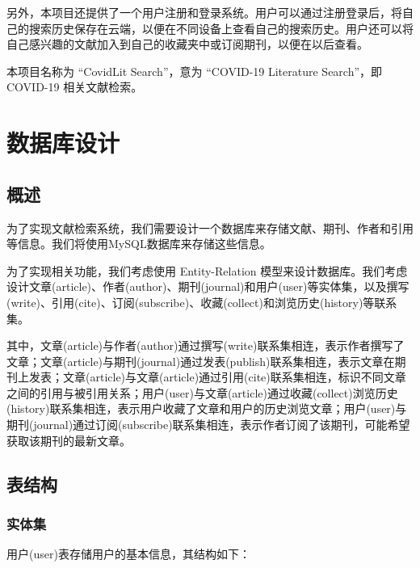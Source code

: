 \documentclass[UTF8,openany]{ctexbook}
\begin{document}
另外，本项目还提供了一个用户注册和登录系统。用户可以通过注册登录后，将自己的搜索历史保存在云端，以便在不同设备上查看自己的搜索历史。用户还可以将自己感兴趣的文献加入到自己的收藏夹中或订阅期刊，以便在以后查看。

本项目名称为 ``CovidLit Search''，意为 ``COVID-19 Literature Search''，即 COVID-19 相关文献检索。

\chapter{数据库设计}

\section{概述}

为了实现文献检索系统，我们需要设计一个数据库来存储文献、期刊、作者和引用等信息。我们将使用MySQL数据库来存储这些信息。

为了实现相关功能，我们考虑使用 Entity-Relation 模型来设计数据库。我们考虑设计文章(article)、作者(author)、期刊(journal)和用户(user)等实体集，以及撰写(write)、引用(cite)、订阅(subscribe)、收藏(collect)和浏览历史(history)等联系集。

其中，文章(article)与作者(author)通过撰写(write)联系集相连，表示作者撰写了文章；文章(article)与期刊(journal)通过发表(publish)联系集相连，表示文章在期刊上发表；文章(article)与文章(article)通过引用(cite)联系集相连，标识不同文章之间的引用与被引用关系；用户(user)与文章(article)通过收藏(collect)浏览历史(history)联系集相连，表示用户收藏了文章和用户的历史浏览文章；用户(user)与期刊(journal)通过订阅(subscribe)联系集相连，表示作者订阅了该期刊，可能希望获取该期刊的最新文章。

\section{表结构}

\subsection{实体集}

用户(user)表存储用户的基本信息，其结构如下：
\end{document}
